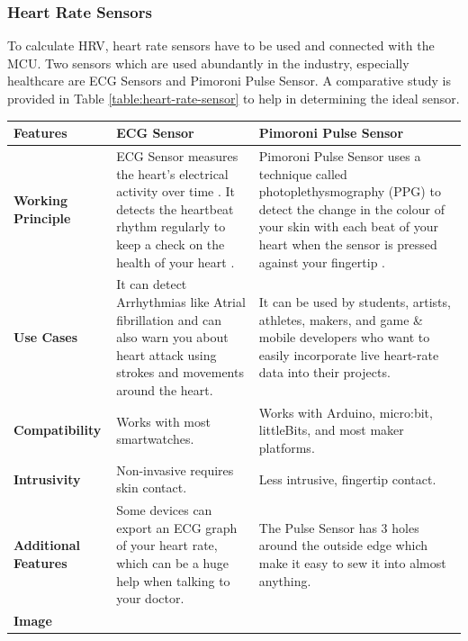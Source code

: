 \subsubsection{Heart Rate Sensors}
To calculate HRV, heart rate sensors have to be used and connected with the MCU. Two sensors which are used abundantly in the industry, especially healthcare are ECG Sensors and Pimoroni Pulse Sensor. A comparative study is provided in Table \ref{table:heart-rate-sensor} to help in determining the ideal sensor. 

\begin{table}[p]
\centering
\begin{tabularx}{\textwidth}{|X|X|X|}
\hline
\textbf{Features} & \textbf{ECG Sensor} & \textbf{Pimoroni Pulse Sensor} \\ \hline
\textbf{Working Principle} &
ECG Sensor measures the heart's electrical activity over time \cite{ref25}. It detects the heartbeat rhythm regularly to keep a check on the health of your heart \cite{ref26}. &
Pimoroni Pulse Sensor uses a technique called photoplethysmography (PPG) to detect the change in the colour of your skin with each beat of your heart when the sensor is pressed against your fingertip \cite{ref27}. \\ \hline
\textbf{Use Cases} & 
It can detect Arrhythmias like Atrial fibrillation and can also warn you about heart attack using strokes and movements around the heart. & 
It can be used by students, artists, athletes, makers, and game \& mobile developers who want to easily incorporate live heart-rate data into their projects. \\ \hline
\textbf{Compatibility} &
Works with most smartwatches. &
Works with Arduino, micro:bit, littleBits, and most maker platforms. \\ \hline
\textbf{Intrusivity} &
Non-invasive requires skin contact. &
Less intrusive, fingertip contact. \\ \hline
\textbf{Additional Features} & 
Some devices can export an ECG graph of your heart rate, which can be a huge help when talking to your doctor. &
The Pulse Sensor has 3 holes around the outside edge which make it easy to sew it into almost anything. \\ \hline
\textbf{Image} & 

\end{tabularx}
\end{table}
